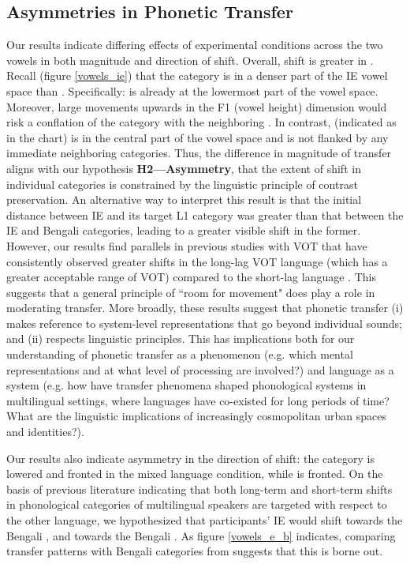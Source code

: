 \documentclass[12 pt]{article}
\newcommand{\nt}[1]{\textipa{[#1]}} %
\begin{document}
\subsection{Asymmetries in Phonetic Transfer}

Our results indicate differing effects of experimental conditions across the two vowels in both magnitude and direction of shift. Overall, shift is greater in \nt{2}. Recall (figure \ref{vowels_ie}) that the category \nt{\ae} is in a denser part of the IE vowel space than \nt{2}. Specifically: \nt{\ae} is already at the lowermost part of the vowel space. Moreover, large movements upwards in the F1 (vowel height) dimension would risk a conflation of the category with the neighboring \nt{E}. In contrast, \nt{2} (indicated as \nt{@} in the chart) is in the central part of the vowel space and is not flanked by any immediate neighboring categories. Thus, the difference in magnitude of transfer aligns with our hypothesis \textbf{H2---Asymmetry}, that the extent of shift in individual categories is constrained by the linguistic principle of contrast preservation. An alternative way to interpret this result is that the initial distance between IE \nt{2} and its target L1 category \nt{a:} was greater than that between the IE and Bengali \nt{\ae} categories, leading to a greater visible shift in the former. However, our results find parallels in previous studies with VOT that have consistently observed greater shifts in the long-lag VOT language (which has a greater acceptable range of VOT) compared to the short-lag language \citep[e.g.][]{antoniou2011inter, bullock2009trying}. This suggests that a general principle of ``room for movement" does play a role in moderating transfer. More broadly, these results suggest that phonetic transfer (i) makes reference to system-level representations that go beyond individual sounds; and (ii) respects linguistic principles. This has implications both for our understanding of phonetic transfer as a phenomenon (e.g. which mental representations and at what level of processing are involved?) and language as a system (e.g. how have transfer phenomena shaped phonological systems in multilingual settings, where languages have co-existed for long periods of time? What are the linguistic implications of increasingly cosmopolitan urban spaces and identities?).

Our results also indicate asymmetry in the direction of shift: the category \nt{2} is lowered and fronted in the mixed language condition, while \nt{\ae} is fronted. On the basis of previous literature indicating that both long-term and short-term shifts in phonological categories of multilingual speakers are targeted with respect to the other language, we hypothesized that participants' IE \nt{\ae} would shift towards the Bengali \nt{\ae}, and \nt{2} towards the Bengali \nt{a:}. As figure \ref{vowels_e_b} indicates, comparing transfer patterns with Bengali categories from \cite{shruticorpus} suggests that this is borne out.
\end{document}
